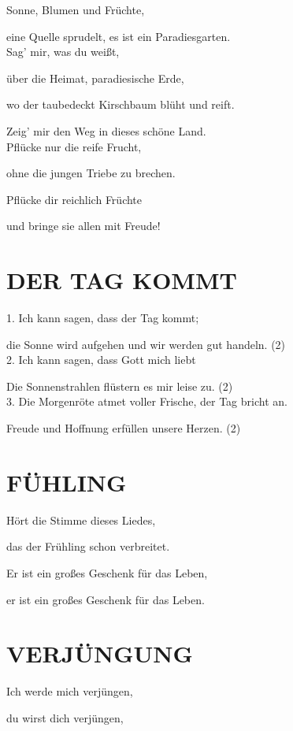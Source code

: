 \documentclass[11pt,a5paper,twoside]{article}
\begin{document}
Sonne, Blumen und Früchte,

eine Quelle sprudelt, es ist ein Paradiesgarten.\\

Sag’ mir, was du weißt,

über die Heimat, paradiesische Erde,

wo der taubedeckt  Kirschbaum blüht und reift.

Zeig’ mir den Weg in dieses schöne Land. \\

Pflücke nur die reife Frucht,

ohne die jungen Triebe zu brechen.

Pflücke dir reichlich Früchte 

und bringe sie allen mit Freude!

\section[Der Tag kommt]{DER TAG KOMMT}

1.	Ich kann sagen, dass der Tag kommt;

die Sonne wird aufgehen und wir werden gut handeln. (2)\\

2.	Ich kann sagen, dass Gott mich liebt

Die Sonnenstrahlen flüstern es mir leise zu. (2) \\

3.	Die Morgenröte atmet voller Frische, der Tag bricht an. 

Freude und Hoffnung erfüllen unsere Herzen. (2)

\section[Frühling]{FÜHLING}

Hört die Stimme dieses Liedes,

das der Frühling schon verbreitet.

Er ist ein großes Geschenk für das Leben,

er ist ein großes Geschenk für das Leben.



\section[Verjüngung]{VERJÜNGUNG}

Ich werde mich verjüngen, 

du wirst dich verjüngen, 
\end{document}
